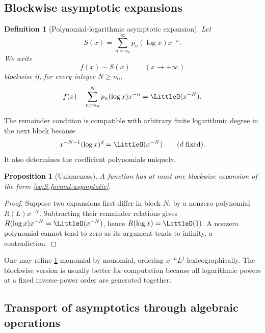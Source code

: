 \documentclass[11pt]{article}
\theoremstyle{pltheorem}
\newtheorem{proposition}[theorem]{Proposition}
\newtheorem{definition}[theorem]{Definition}
\begin{document}
\subsection{Blockwise asymptotic expansions}

\begin{definition}[Polynomial-logarithmic asymptotic expansion]\label{def:block-asymptotic}
Let
\begin{equation}\label{eq:S-formal-asymptotic}
 S(x)=\sum_{n=n_0}^{\infty}p_n(\log x)x^{-n}.
\end{equation}
We write
\begin{equation}\label{eq:f-sim-S}
 f(x)\sim S(x)\qquad(x\to+\infty)
\end{equation}
blockwise if, for every integer \(N\ge n_0\),
\begin{equation}\label{eq:block-remainder}
 f(x)-\sum_{n=n_0}^{N}p_n(\log x)x^{-n}
 =\LittleO(x^{-N}).
\end{equation}
\end{definition}

The remainder condition is compatible with arbitrary finite logarithmic degree in the next block because
\begin{equation}\label{eq:log-smaller-power}
 x^{-N-1}(\log x)^d=\LittleO(x^{-N})
 \qquad(d\text{ fixed}).
\end{equation}
It also determines the coefficient polynomials uniquely.

\begin{proposition}[Uniqueness]\label{prop:asymptotic-uniqueness}
A function has at most one blockwise expansion of the form
\cref{eq:S-formal-asymptotic}.
\end{proposition}

\begin{proof}
Suppose two expansions first differ in block \(N\), by a nonzero polynomial
\(R(L)x^{-N}\).  Subtracting their remainder relations gives
\(R(\log x)x^{-N}=\LittleO(x^{-N})\), hence
\(R(\log x)=\LittleO(1)\).  A nonzero polynomial cannot tend to zero as its argument tends to infinity, a contradiction.
\end{proof}

One may refine \cref{def:block-asymptotic} monomial by monomial, ordering
\(x^{-n}L^j\) lexicographically.  The blockwise version is usually better for computation because all logarithmic powers at a fixed inverse-power order are generated together.

\subsection{Transport of asymptotics through algebraic operations}
\end{document}
